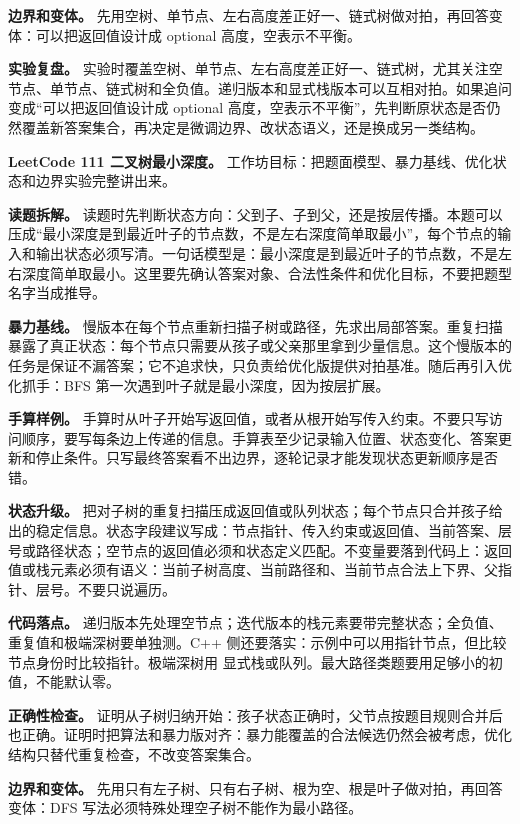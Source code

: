 \textbf{边界和变体。} 先用空树、单节点、左右高度差正好一、链式树做对拍，再回答变体：可以把返回值设计成 optional 高度，空表示不平衡。

\textbf{实验复盘。} 实验时覆盖空树、单节点、左右高度差正好一、链式树，尤其关注空节点、单节点、链式树和全负值。递归版本和显式栈版本可以互相对拍。如果追问变成“可以把返回值设计成 optional 高度，空表示不平衡”，先判断原状态是否仍然覆盖新答案集合，再决定是微调边界、改状态语义，还是换成另一类结构。

\noindent\textbf{LeetCode 111 二叉树最小深度。} 工作坊目标：把题面模型、暴力基线、优化状态和边界实验完整讲出来。

\textbf{读题拆解。} 读题时先判断状态方向：父到子、子到父，还是按层传播。本题可以压成“最小深度是到最近叶子的节点数，不是左右深度简单取最小”，每个节点的输入和输出状态必须写清。一句话模型是：最小深度是到最近叶子的节点数，不是左右深度简单取最小。这里要先确认答案对象、合法性条件和优化目标，不要把题型名字当成推导。

\textbf{暴力基线。} 慢版本在每个节点重新扫描子树或路径，先求出局部答案。重复扫描暴露了真正状态：每个节点只需要从孩子或父亲那里拿到少量信息。这个慢版本的任务是保证不漏答案；它不追求快，只负责给优化版提供对拍基准。随后再引入优化抓手：BFS 第一次遇到叶子就是最小深度，因为按层扩展。

\textbf{手算样例。} 手算时从叶子开始写返回值，或者从根开始写传入约束。不要只写访问顺序，要写每条边上传递的信息。手算表至少记录输入位置、状态变化、答案更新和停止条件。只写最终答案看不出边界，逐轮记录才能发现状态更新顺序是否错。

\textbf{状态升级。} 把对子树的重复扫描压成返回值或队列状态；每个节点只合并孩子给出的稳定信息。状态字段建议写成：节点指针、传入约束或返回值、当前答案、层号或路径状态；空节点的返回值必须和状态定义匹配。不变量要落到代码上：返回值或栈元素必须有语义：当前子树高度、当前路径和、当前节点合法上下界、父指针、层号。不要只说遍历。

\textbf{代码落点。} 递归版本先处理空节点；迭代版本的栈元素要带完整状态；全负值、重复值和极端深树要单独测。C++ 侧还要落实：示例中可以用指针节点，但比较节点身份时比较指针。极端深树用  显式栈或队列。最大路径类题要用足够小的初值，不能默认零。

\textbf{正确性检查。} 证明从子树归纳开始：孩子状态正确时，父节点按题目规则合并后也正确。证明时把算法和暴力版对齐：暴力能覆盖的合法候选仍然会被考虑，优化结构只替代重复检查，不改变答案集合。

\textbf{边界和变体。} 先用只有左子树、只有右子树、根为空、根是叶子做对拍，再回答变体：DFS 写法必须特殊处理空子树不能作为最小路径。

